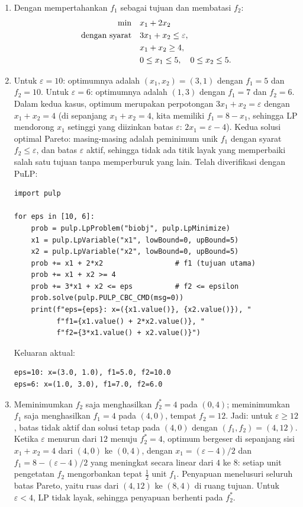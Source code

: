 \begin{enumerate}
\item Dengan mempertahankan $f_1$ sebagai tujuan dan membatasi $f_2$:
\begin{align*}
\min \quad & x_1 + 2x_2 \\
\mbox{dengan syarat}\quad & 3x_1 + x_2 \leq \varepsilon, \\
& x_1 + x_2 \geq 4, \\
& 0 \leq x_1 \leq 5, \quad 0 \leq x_2 \leq 5.
\end{align*}
\item Untuk $\varepsilon = 10$: optimumnya adalah $(x_1, x_2) = (3, 1)$ dengan
$f_1 = 5$ dan $f_2 = 10$. Untuk $\varepsilon = 6$: optimumnya adalah $(1, 3)$
dengan $f_1 = 7$ dan $f_2 = 6$. Dalam kedua kasus, optimum merupakan
perpotongan $3x_1 + x_2 = \varepsilon$ dengan $x_1 + x_2 = 4$ (di sepanjang
$x_1 + x_2 = 4$, kita memiliki $f_1 = 8 - x_1$, sehingga LP mendorong $x_1$
setinggi yang diizinkan batas $\varepsilon$: $2x_1 = \varepsilon - 4$). Kedua
solusi optimal Pareto: masing-masing adalah peminimum unik $f_1$ dengan syarat
$f_2 \leq \varepsilon$, dan batas $\varepsilon$ aktif, sehingga tidak ada titik
layak yang memperbaiki salah satu tujuan tanpa memperburuk yang lain.
Telah diverifikasi dengan PuLP:

\begin{verbatim}
import pulp

for eps in [10, 6]:
    prob = pulp.LpProblem("biobj", pulp.LpMinimize)
    x1 = pulp.LpVariable("x1", lowBound=0, upBound=5)
    x2 = pulp.LpVariable("x2", lowBound=0, upBound=5)
    prob += x1 + 2*x2                 # f1 (tujuan utama)
    prob += x1 + x2 >= 4
    prob += 3*x1 + x2 <= eps          # f2 <= epsilon
    prob.solve(pulp.PULP_CBC_CMD(msg=0))
    print(f"eps={eps}: x=({x1.value()}, {x2.value()}), "
          f"f1={x1.value() + 2*x2.value()}, "
          f"f2={3*x1.value() + x2.value()}")
\end{verbatim}

Keluaran aktual:
\begin{verbatim}
eps=10: x=(3.0, 1.0), f1=5.0, f2=10.0
eps=6: x=(1.0, 3.0), f1=7.0, f2=6.0
\end{verbatim}

\item Meminimumkan $f_2$ saja menghasilkan $f_2^* = 4$ pada $(0, 4)$;
meminimumkan $f_1$ saja menghasilkan $f_1 = 4$ pada $(4, 0)$, tempat
$f_2 = 12$. Jadi: untuk $\varepsilon \geq 12$, batas tidak aktif dan solusi
tetap pada $(4,0)$ dengan $(f_1, f_2) = (4, 12)$. Ketika $\varepsilon$ menurun
dari $12$ menuju $f_2^* = 4$, optimum bergeser di sepanjang sisi
$x_1 + x_2 = 4$ dari $(4,0)$ ke $(0,4)$, dengan
$x_1 = (\varepsilon - 4)/2$ dan
$f_1 = 8 - (\varepsilon - 4)/2$ yang meningkat secara linear dari $4$ ke $8$:
setiap unit pengetatan $f_2$ mengorbankan tepat $\tfrac12$ unit $f_1$.
Penyapuan menelusuri seluruh batas Pareto, yaitu ruas dari $(4,12)$ ke $(8,4)$
di ruang tujuan. Untuk $\varepsilon < 4$, LP tidak layak, sehingga penyapuan
berhenti pada $f_2^*$.
\end{enumerate}

